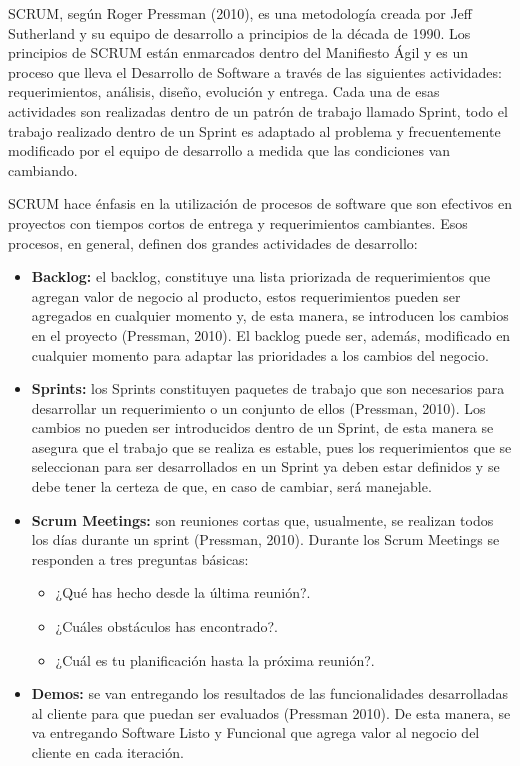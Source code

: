 SCRUM, según Roger Pressman (2010), es una metodología creada por Jeff Sutherland y su equipo de desarrollo a principios de la década de 1990. Los principios de SCRUM están enmarcados dentro del Manifiesto Ágil y es un proceso que lleva el Desarrollo de Software a través de las siguientes actividades: requerimientos, análisis, diseño, evolución y entrega. Cada una de esas actividades son realizadas dentro de un patrón de trabajo llamado Sprint, todo el trabajo realizado dentro de un Sprint es adaptado al problema y frecuentemente modificado por el equipo de desarrollo a medida que las condiciones van cambiando.

SCRUM hace énfasis en la utilización de procesos de software que son efectivos en proyectos con tiempos cortos de entrega y requerimientos cambiantes. Esos procesos, en general, definen dos grandes actividades de desarrollo:

\begin{itemize}
\item \textbf{Backlog:} el backlog, constituye una lista priorizada de requerimientos que agregan valor de negocio al producto, estos requerimientos pueden ser agregados en cualquier momento y, de esta manera, se introducen los cambios en el proyecto (Pressman, 2010). El backlog puede ser, además, modificado en cualquier momento para adaptar las prioridades a los cambios del negocio.
\item \textbf{Sprints:} los Sprints constituyen paquetes de trabajo que son necesarios para desarrollar un requerimiento o un conjunto de ellos (Pressman, 2010). Los cambios no pueden ser introducidos dentro de un Sprint, de esta manera se asegura que el trabajo que se realiza es estable, pues los requerimientos que se seleccionan para ser desarrollados en un Sprint ya deben estar definidos y se debe tener la certeza de que, en caso de cambiar, será manejable.
\item \textbf{Scrum Meetings:} son reuniones cortas que, usualmente, se realizan todos los días durante un sprint (Pressman, 2010). Durante los Scrum Meetings se responden a tres preguntas básicas:
\begin{itemize}
\item ¿Qué has hecho desde la última reunión?.
\item ¿Cuáles obstáculos has encontrado?.
\item ¿Cuál es tu planificación hasta la próxima reunión?.
\end{itemize}
\item \textbf{Demos:} se van entregando los resultados de las funcionalidades desarrolladas al cliente para que puedan ser evaluados (Pressman 2010). De esta manera, se va entregando Software Listo y Funcional que agrega valor al negocio del cliente en cada iteración.
\end{itemize}

